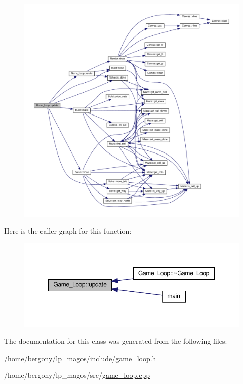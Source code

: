 \begin{figure}[H]
\begin{center}
\leavevmode
\includegraphics[width=350pt]{classGame__Loop_a549ad971281e15afa38a5dc204843891_cgraph}
\end{center}
\end{figure}
Here is the caller graph for this function\+:\nopagebreak
\begin{figure}[H]
\begin{center}
\leavevmode
\includegraphics[width=350pt]{classGame__Loop_a549ad971281e15afa38a5dc204843891_icgraph}
\end{center}
\end{figure}


The documentation for this class was generated from the following files\+:\begin{DoxyCompactItemize}
\item 
/home/bergony/lp\+\_\+magos/include/\hyperlink{game__loop_8h}{game\+\_\+loop.\+h}\item 
/home/bergony/lp\+\_\+magos/src/\hyperlink{game__loop_8cpp}{game\+\_\+loop.\+cpp}\end{DoxyCompactItemize}
